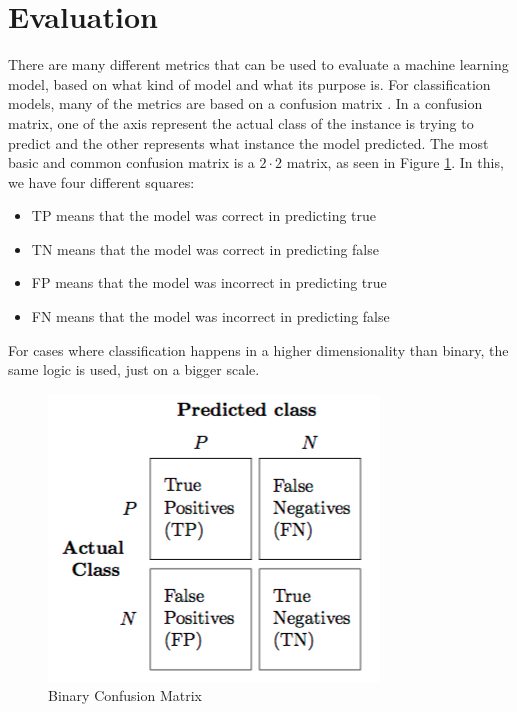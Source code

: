 \documentclass[nofilelist]{cslthse-msc}
\begin{document}
\section{Evaluation}
There are many different metrics that can be used to evaluate a machine learning model, based on what kind of model and what its purpose is. For classification models, many of the metrics are based on a confusion matrix \citep{FAWCETT2006861}. In a confusion matrix, one of the axis represent the actual class of the instance is trying to predict and the other represents what instance the model predicted. The most basic and common confusion matrix is a $2 \cdot 2$ matrix, as seen in Figure \ref{fig:confusion}. In this, we have four different squares: 
\begin{itemize}
    \item TP means that the model was correct in predicting true
    \item TN means that the model was correct in predicting false
    \item FP means that the model was incorrect in predicting true
    \item FN means that the model was incorrect in predicting false 
\end{itemize}

For cases where classification happens in a higher dimensionality than binary, the same logic is used, just on a bigger scale. 






\begin{figure}[h!]
    \centering
    \includegraphics[width=\textwidth/2]{msccls/explanatory_images/confusion_matrix.png}
    \caption{Binary Confusion Matrix}
    \label{fig:confusion}
\end{figure}
\end{document}
